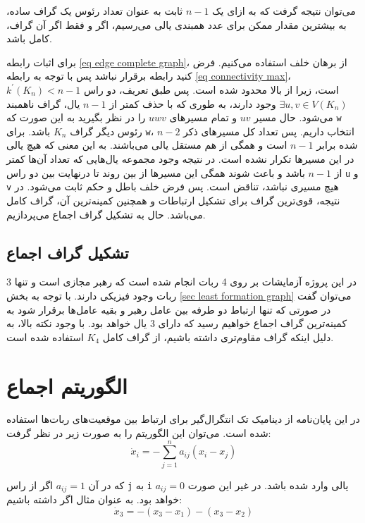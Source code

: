 می‌توان نتیجه گرفت که به ازای یک 
$n-1$ 
ثابت به عنوان تعداد رئوس یک گراف ساده، به بیشترین مقدار ممکن برای عدد همبندی یالی می‌رسیم، اگر و فقط اگر آن گراف، کامل باشد.

برای اثبات رابطه \ref{eq edge complete graph}، از برهان خلف استفاده می‌کنیم. فرض کنید رابطه برقرار نباشد پس با توجه به رابطه \ref{eq connectivity max}، 
$k^\prime(K_n) < n-1$
است، زیرا از بالا محدود شده است. پس طبق تعریف، دو راس 
$\exists u,v \in V(K_n)$ 
وجود دارند، به طوری که با حذف کمتر از 
$n-1$
یال، گراف ناهمبند می‌شود. حال مسیر 
$uv$ 
و تمام مسیرهای 
$uwv$ 
را در نظر بگیرید به این صورت که \verb|w| رئوس دیگر گراف 
$K_n$
باشد. برای \verb|w|، 
$n-2$ 
انتخاب داریم. پس تعداد کل مسیرهای ذکر شده برابر 
$n-1$ 
است و همگی از هم مستقل یالی می‌باشند. به این معنی که هیچ یالی در این مسیرها تکرار نشده است. در نتیجه وجود مجموعه‌ یال‌هایی که تعداد آن‌ها کمتر از 
$n-1$ 
باشد و باعث شوند همگی این مسیرها از بین روند تا درنهایت بین دو راس \verb|u| و \verb|v| هیچ مسیری نباشد، تناقض است. پس فرض خلف باطل و حکم ثابت می‌شود. در نتیجه، قوی‌ترین گراف برای تشکیل ارتباطات و همچنین کمینه‌ترین آن، گراف کامل می‌باشد. حال به تشکیل گراف اجماع می‌پردازیم.

\subsection{تشکیل گراف اجماع}
در این پروژه آزمایشات بر روی 4 ربات انجام شده است که رهبر مجازی است و تنها 3 ربات وجود فیزیکی دارند. با توجه به بخش \ref{sec least formation graph} می‌توان گفت در صورتی که تنها ارتباط دو طرفه بین عامل رهبر و بقیه عامل‌ها برقرار شود به کمینه‌ترین گراف اجماع خواهیم رسید که دارای 3 یال خواهد بود. با وجود نکته بالا، به دلیل اینکه گراف مقاوم‌تری داشته باشیم، از گراف کامل $K_4$ استفاده شده است. 


\section{الگوریتم اجماع}
در این پایان‌نامه از دینامیک تک انتگرال‌گیر برای ارتباط بین موقعیت‌های ربات‌ها استفاده شده است. می‌توان این الگوریتم‌ را به صورت زیر در نظر گرفت:
\begin{equation}\label{eq platoon sum}
\dot{x}_i = -\sum_{j=1}^{n} a_{ij}(x_i-x_j)
\end{equation}

که در آن $a_{ij} = 1$ اگر از راس \verb|j| به \verb|i| یالی وارد شده باشد. در غیر این صورت $a_{ij} = 0$ خواهد بود. به عنوان مثال اگر داشته باشیم:
\begin{equation}
\dot{x}_3 = -(x_3-x_1)-(x_3-x_2)
\end{equation}

